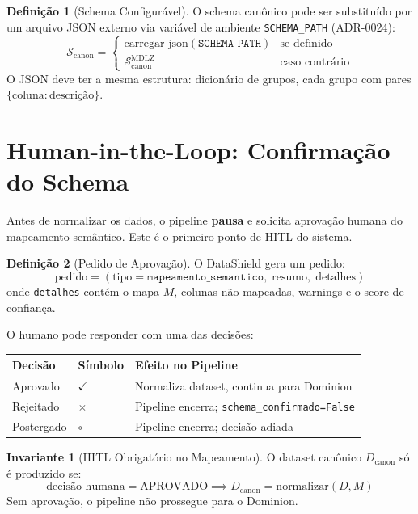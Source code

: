 \documentclass[a4paper, 12pt]{report}
\theoremstyle{definition}
\newtheorem{definicao}{Defini\c{c}\~ao}[chapter]
\newtheorem{invariante}{Invariante}[chapter]
\theoremstyle{remark}
\begin{document}
\begin{definicao}[Schema Configur\'avel]
  O schema can\^onico pode ser substitu\'ido por um arquivo JSON externo
  via vari\'avel de ambiente \texttt{SCHEMA\_PATH} (ADR-0024):
  \[
    \mathcal{S}_{\text{canon}} = \begin{cases}
      \text{carregar\_json}(\texttt{SCHEMA\_PATH}) & \text{se definido} \\
      \mathcal{S}_{\text{canon}}^{\text{MDLZ}} & \text{caso contr\'ario}
    \end{cases}
  \]
  O JSON deve ter a mesma estrutura: dicion\'ario de grupos,
  cada grupo com pares $\{\text{coluna}: \text{descri\c{c}\~ao}\}$.
\end{definicao}


\section{Human-in-the-Loop: Confirma\c{c}\~ao do Schema}

Antes de normalizar os dados, o pipeline \textbf{pausa} e solicita
aprova\c{c}\~ao humana do mapeamento sem\^antico. Este \'e o primeiro
ponto de HITL do sistema.

\begin{definicao}[Pedido de Aprova\c{c}\~ao]
  O DataShield gera um pedido:
  \[
    \text{pedido} = (\text{tipo}=\texttt{mapeamento\_semantico},\;
    \text{resumo},\; \text{detalhes})
  \]
  onde \texttt{detalhes} cont\'em o mapa $M$, colunas n\~ao mapeadas,
  warnings e o score de confian\c{c}a.
\end{definicao}

O humano pode responder com uma das decis\~oes:

\begin{center}
\begin{tabular}{llp{6cm}}
  \toprule
  \textbf{Decis\~ao} & \textbf{S\'imbolo} & \textbf{Efeito no Pipeline} \\
  \midrule
  Aprovado & $\checkmark$ & Normaliza dataset, continua para Dominion \\
  Rejeitado & $\times$ & Pipeline encerra; \texttt{schema\_confirmado=False} \\
  Postergado & $\circ$ & Pipeline encerra; decis\~ao adiada \\
  \bottomrule
\end{tabular}
\end{center}

\begin{invariante}[HITL Obrigat\'orio no Mapeamento]
  O dataset can\^onico $D_{\text{canon}}$ s\'o \'e produzido se:
  \[
    \text{decis\~ao\_humana} = \text{APROVADO} \implies
    D_{\text{canon}} = \text{normalizar}(D, M)
  \]
  Sem aprova\c{c}\~ao, o pipeline n\~ao prossegue para o Dominion.
\end{invariante}
\end{document}
